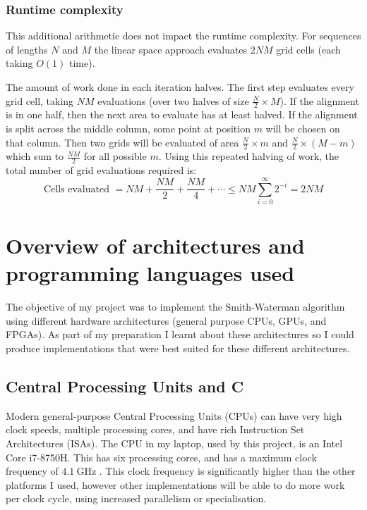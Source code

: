 \subsubsection{Runtime complexity}
\label{sec:SW_Linear_Complexity}
This additional arithmetic does not impact the runtime complexity.
For sequences of lengths $N$ and $M$ the linear space approach evaluates $2NM$ grid cells (each taking $O(1)$ time).

The amount of work done in each iteration halves. The first step evaluates every grid cell, taking $NM$ evaluations (over two halves of size $\frac{N}{2} \times M$).
If the alignment is in one half, then the next area to evaluate has at least halved.
If the alignment is split across the middle column, some point at position $m$ will be chosen on that column.
Then two grids will be evaluated of area $\frac{N}{2} \times m$ and $\frac{N}{2} \times (M-m)$ which sum to $\frac{NM}{2}$ for all possible $m$.
Using this repeated halving of work, the total number of grid evaluations required is:
$$ \text{Cells evaluated } =  NM + \frac{NM}{2} + \frac{NM}{4} + \cdots \leq NM \sum_{i=0}^\infty 2^{-i} = 2NM $$

\section{Overview of architectures and programming languages used}
\label{sec:Architecture_prep}
The objective of my project was to implement the Smith-Waterman algorithm using different hardware architectures (general purpose CPUs, GPUs, and FPGAs).
As part of my preparation I learnt about these architectures so I could produce implementations that were best suited for these different architectures.

\subsection{Central Processing Units and C}
\label{sec:CPU_prep}
Modern general-purpose Central Processing Units (CPUs) can have very high clock speeds, multiple processing cores, and have rich Instruction Set Architectures (ISAs).
The CPU in my laptop, used by this project, is an Intel Core i7-8750H.
This has six processing cores, and has a maximum clock frequency of $\SI{4.1}{\giga\hertz}$ \cite{i7-8750H}.
This clock frequency is significantly higher than the other platforms I used, however other implementations will be able to do more work per clock cycle, using increased parallelism or specialisation.

